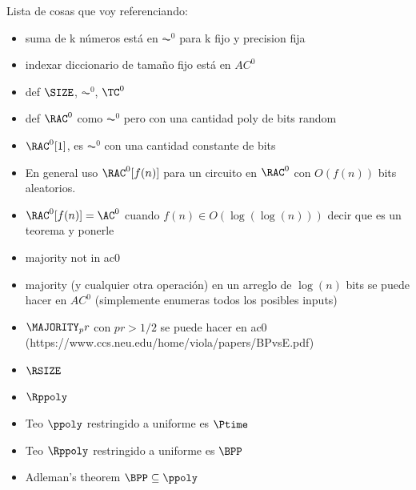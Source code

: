 {\color{orange}
Lista de cosas que voy referenciando:

\begin{itemize}
    \item suma de k números está en $\AC^0$ para k fijo y precision fija
    \item indexar diccionario de tamaño fijo está en $AC^0$
    \item def $\SIZE$, $\AC^0$, $\TC^0$
    \item def $\RAC^0$ como $\AC^0$ pero con una cantidad poly de bits random
    \item $\RAC^0[1]$, es $\AC^0$ con una cantidad constante de bits
    \item En general uso $\RAC^0[f(n)]$ para un circuito en $\RAC^0$ con $O(f(n))$ bits aleatorios.
    \item $\RAC^0[f(n)] = \AC^0$ cuando $f(n) \in O(\log(\log(n)))$ decir que es un teorema y ponerle \label{const-random-in-ac0}
    \item majority not in ac0
    \item majority (y cualquier otra operación) en un arreglo de $\log(n)$ bits se puede hacer en $AC^0$ (simplemente enumeras todos los posibles inputs)
    \item $\MAJORITY_pr$ con $pr > 1/2$ se puede hacer en ac0 (https://www.ccs.neu.edu/home/viola/papers/BPvsE.pdf)
    \item $\RSIZE$
    \item $\Rppoly$
    \item Teo $\ppoly$ restringido a uniforme es $\Ptime$ \label{uppoly-equals-p}
    \item Teo $\Rppoly$ restringido a uniforme es $\BPP$ \label{urppoly-equals-bpp}
    \item Adleman's theorem $\BPP \subseteq \ppoly$ \label{adleman}
\end{itemize}
}

